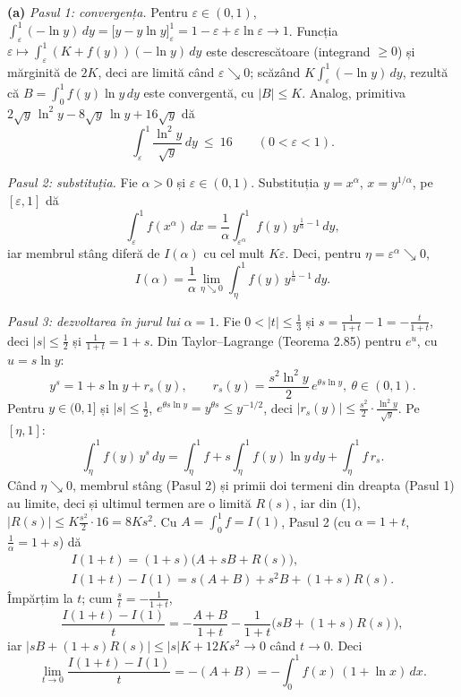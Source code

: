 \noindent\textbf{(a)} \emph{Pasul 1: convergența.} Pentru $\varepsilon\in(0,1)$, $\int_\varepsilon^1(-\ln y)\,dy=\bigl[y-y\ln y\bigr]_\varepsilon^1=1-\varepsilon+\varepsilon\ln\varepsilon\to1$. Funcția $\varepsilon\mapsto\int_\varepsilon^1(K+f(y))(-\ln y)\,dy$ este descrescătoare (integrand $\ge0$) și mărginită de $2K$, deci are limită când $\varepsilon\searrow0$; scăzând $K\int_\varepsilon^1(-\ln y)\,dy$, rezultă că $B=\int_0^1f(y)\ln y\,dy$ este convergentă, cu $|B|\le K$. Analog, primitiva $2\sqrt y\,\ln^{2}y-8\sqrt y\,\ln y+16\sqrt y$ dă
\[ \int_\varepsilon^1\frac{\ln^{2}y}{\sqrt y}\,dy\ \le\ 16\qquad(0<\varepsilon<1) . \tag{1} \]

\emph{Pasul 2: substituția.} Fie $\alpha>0$ și $\varepsilon\in(0,1)$. Substituția $y=x^{\alpha}$, $x=y^{1/\alpha}$, pe $[\varepsilon,1]$ dă
\[ \int_\varepsilon^1f(x^{\alpha})\,dx=\frac1\alpha\int_{\varepsilon^{\alpha}}^1f(y)\,y^{\frac1\alpha-1}\,dy , \]
iar membrul stâng diferă de $I(\alpha)$ cu cel mult $K\varepsilon$. Deci, pentru $\eta=\varepsilon^{\alpha}\searrow0$,
\[ I(\alpha)=\frac1\alpha\lim_{\eta\searrow0}\int_\eta^1f(y)\,y^{\frac1\alpha-1}\,dy . \]

\emph{Pasul 3: dezvoltarea în jurul lui $\alpha=1$.} Fie $0<|t|\le\frac13$ și $s=\frac{1}{1+t}-1=-\frac{t}{1+t}$, deci $|s|\le\frac12$ și $\frac1{1+t}=1+s$. Din Taylor--Lagrange (Teorema 2.85) pentru $e^{u}$, cu $u=s\ln y$:
\[ y^{s}=1+s\ln y+r_{s}(y),\qquad r_{s}(y)=\frac{s^{2}\ln^{2}y}{2}\,e^{\theta s\ln y},\ \theta\in(0,1) . \]
Pentru $y\in(0,1]$ și $|s|\le\frac12$, $e^{\theta s\ln y}=y^{\theta s}\le y^{-1/2}$, deci $|r_{s}(y)|\le\frac{s^{2}}{2}\cdot\frac{\ln^{2}y}{\sqrt y}$. Pe $[\eta,1]$:
\[ \int_\eta^1f(y)\,y^{s}\,dy=\int_\eta^1f+s\int_\eta^1f(y)\ln y\,dy+\int_\eta^1f\,r_{s} . \]
Când $\eta\searrow0$, membrul stâng (Pasul 2) și primii doi termeni din dreapta (Pasul 1) au limite, deci și ultimul termen are o limită $R(s)$, iar din (1), $|R(s)|\le K\frac{s^{2}}{2}\cdot16=8Ks^{2}$. Cu $A=\int_0^1f=I(1)$, Pasul 2 (cu $\alpha=1+t$, $\frac1\alpha=1+s$) dă
\[ \begin{gathered} I(1+t)=(1+s)\bigl(A+sB+R(s)\bigr),\\ I(1+t)-I(1)=s(A+B)+s^{2}B+(1+s)R(s) . \end{gathered} \]
Împărțim la $t$; cum $\frac st=-\frac{1}{1+t}$,
\[ \frac{I(1+t)-I(1)}{t}=-\frac{A+B}{1+t}-\frac{1}{1+t}\bigl(sB+(1+s)R(s)\bigr) , \]
iar $|sB+(1+s)R(s)|\le|s|K+12K s^{2}\to0$ când $t\to0$. Deci
\[ \lim_{t\to0}\frac{I(1+t)-I(1)}{t}=-(A+B)=-\int_0^1f(x)\,(1+\ln x)\,dx . \]

